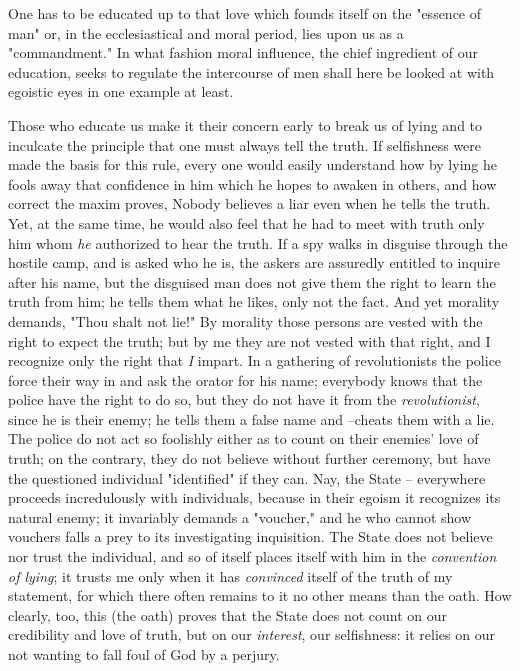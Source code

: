 One has to be educated up to that love which founds itself on the "{}essence 
of man"{} or, in the ecclesiastical and moral period, lies upon us as a 
"{}commandment."{} In what fashion moral influence, the chief ingredient of 
our education, seeks to regulate the intercourse of men shall here be looked 
at with egoistic eyes in one example at least.

Those who educate us make it their concern early to break us of lying and to 
inculcate the principle that one must always tell the truth. If selfishness 
were made the basis for this rule, every one would easily understand how by 
lying he fools away that confidence in him which he hopes to awaken in others, 
and how correct the maxim proves, Nobody believes a liar even when he tells 
the truth. Yet, at the same time, he would also feel that he had to meet with 
truth only him whom \textit{he} authorized to hear the truth. If a spy walks 
in disguise through the hostile camp, and is asked who he is, the askers are 
assuredly entitled to inquire after his name, but the disguised man does not 
give them the right to learn the truth from him; he tells them what he likes, 
only not the fact. And yet morality demands, "{}Thou shalt not lie!"{} By 
morality those persons are vested with the right to expect the truth; but by 
me they are not vested with that right, and I recognize only the right that 
\textit{I} impart. In a gathering of revolutionists the police force their way 
in and ask the orator for his name; everybody knows that the police have the 
right to do so, but they do not have it from the \textit{revolutionist}, since 
he is their enemy; he tells them a false name and --cheats them with a lie. 
The police do not act so foolishly either as to count on their enemies' love 
of truth; on the contrary, they do not believe without further ceremony, but 
have the questioned individual "{}identified"{} if they can. Nay, the State -- 
everywhere proceeds incredulously with individuals, because in their egoism it 
recognizes its natural enemy; it invariably demands a "{}voucher,"{} and he 
who cannot show vouchers falls a prey to its investigating inquisition. The 
State does not believe nor trust the individual, and so of itself places 
itself with him in the \textit{convention of lying}; it trusts me only when it 
has \textit{convinced} itself of the truth of my statement, for which there 
often remains to it no other means than the oath. How clearly, too, this (the 
oath) proves that the State does not count on our credibility and love of 
truth, but on our \textit{interest}, our selfishness: it relies on our not 
wanting to fall foul of God by a perjury.

